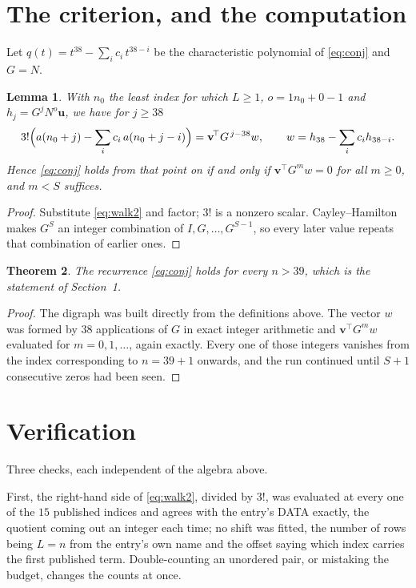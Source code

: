 \documentclass[11pt,a4paper]{article}
\theoremstyle{plain}
\newtheorem{theorem}{Theorem}
\newtheorem{lemma}[theorem]{Lemma}
\theoremstyle{definition}
\begin{document}
\section{The criterion, and the computation}

Let $q(t)=t^{38}-\sum_i c_i\,t^{38-i}$ be the characteristic polynomial of
\eqref{eq:conj} and $G=N$.

\begin{lemma}\label{lem:crit}
With $n_0$ the least index for which $L\ge1$, $o=1n_0+0-1$ and
$h_j=G^{j}N^{o}\mathbf{u}$, we have for $j\ge38$
\[
3!\Bigl(a(n_0+j)-\sum_i c_i\,a(n_0+j-i)\Bigr)=\mathbf{v}^{\!\top}G^{\,j-38}w,
\qquad w=h_{38}-\sum_i c_ih_{38-i} .
\]
Hence \eqref{eq:conj} holds from that point on if and only if
$\mathbf{v}^{\!\top}G^{m}w=0$ for all $m\ge0$, and $m<S$ suffices.
\end{lemma}

\begin{proof}
Substitute \eqref{eq:walk2} and factor; $3!$ is a nonzero scalar. Cayley--Hamilton
makes $G^{S}$ an integer combination of $I,G,\dots,G^{S-1}$, so every later value repeats
that combination of earlier ones.
\end{proof}

\begin{theorem}
The recurrence \eqref{eq:conj} holds for every $n>39$, which is the statement of
Section~1.
\end{theorem}

\begin{proof}
The digraph was built directly from the definitions above. The vector $w$ was formed by
$38$ applications of $G$ in exact integer arithmetic and $\mathbf{v}^{\!\top}G^{m}w$
evaluated for $m=0,1,\dots$, again exactly. Every one of those integers vanishes from the
index corresponding to $n=39+1$ onwards, and the run continued until $S+1$ consecutive
zeros had been seen.
\end{proof}

\section{Verification}

Three checks, each independent of the algebra above.

First, the right-hand side of \eqref{eq:walk2}, divided by $3!$, was evaluated at every
one of the $15$ published indices and agrees with the entry's DATA exactly, the quotient
coming out an integer each time; no shift was fitted, the number of rows being $L=n$
from the entry's own name and the offset saying which index carries the first published term.
Double-counting an unordered pair, or mistaking the budget, changes the counts at once.
\end{document}
